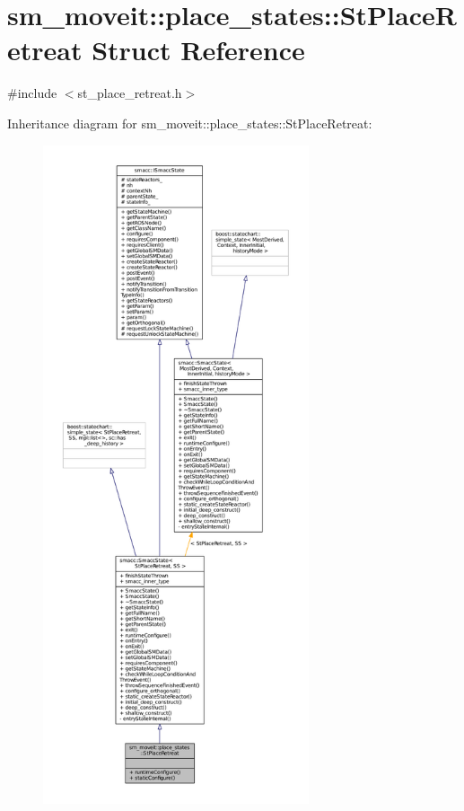 \hypertarget{structsm__moveit_1_1place__states_1_1StPlaceRetreat}{}\section{sm\+\_\+moveit\+:\+:place\+\_\+states\+:\+:St\+Place\+Retreat Struct Reference}
\label{structsm__moveit_1_1place__states_1_1StPlaceRetreat}


{\ttfamily \#include $<$st\+\_\+place\+\_\+retreat.\+h$>$}



Inheritance diagram for sm\+\_\+moveit\+:\+:place\+\_\+states\+:\+:St\+Place\+Retreat\+:
\nopagebreak
\begin{figure}[H]
\begin{center}
\leavevmode
\includegraphics[height=550pt]{structsm__moveit_1_1place__states_1_1StPlaceRetreat__inherit__graph}
\end{center}
\end{figure}



